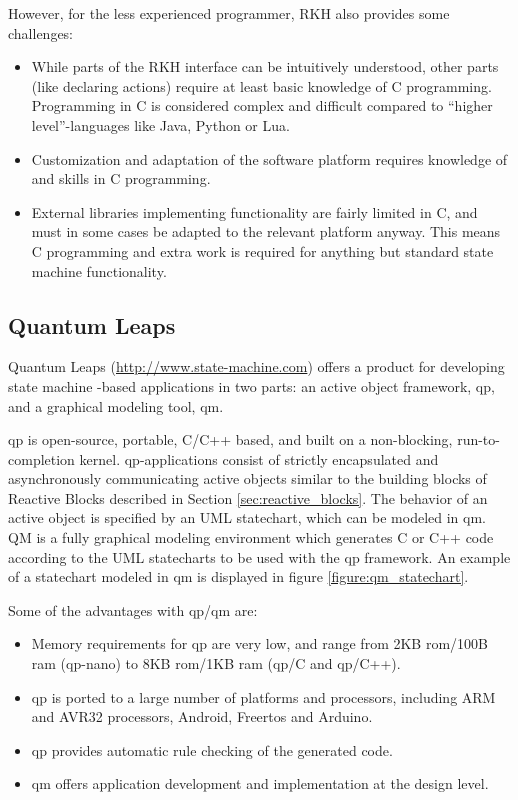 However, for the less experienced programmer, RKH also provides some challenges:
\begin{itemize}
	\item While parts of the RKH interface can be intuitively understood, other parts (like declaring actions) require at least basic knowledge of C programming. Programming in C is considered complex and difficult compared to “higher level”-languages like Java, Python or Lua.
	\item Customization and adaptation of the software platform requires knowledge of and skills in C programming.
	\item External libraries implementing functionality are fairly limited in C, and must in some cases be adapted to the relevant platform anyway. This means C programming and extra work is required for anything but standard state machine functionality.
\end{itemize}

\subsection{Quantum Leaps}
\label{sec:quantum_leaps}
Quantum Leaps (\url{http://www.state-machine.com}) offers a product for developing state machine -based applications in two parts: an active object framework, \gls{qp}, and a graphical modeling tool, \gls{qm}.

\gls{qp} is open-source, portable, C/C++ based, and built on a non-blocking, run-to-completion kernel. \gls{qp}-applications consist of strictly encapsulated and asynchronously communicating active objects similar to the building blocks of Reactive Blocks described in Section \ref{sec:reactive_blocks}. The behavior of an active object is specified by an UML statechart, which can be modeled in \gls{qm}. QM is a fully graphical modeling environment which generates C or C++ code according to the UML statecharts to be used with the \gls{qp} framework. An example of a statechart modeled in \gls{qm} is displayed in figure \ref{figure:qm_statechart}.

Some of the advantages with \gls{qp}/\gls{qm} are:
\begin{itemize}
	\item Memory requirements for \gls{qp} are very low, and range from 2KB \gls{rom}/100B \gls{ram} (\gls{qp}-nano) to 8KB \gls{rom}/1KB \gls{ram} (\gls{qp}/C and \gls{qp}/C++).
	\item \gls{qp} is ported to a large number of platforms and processors, including ARM and AVR32 processors, Android, Free\gls{rtos} and Arduino.
	\item \gls{qp} provides automatic rule checking of the generated code.
	\item \gls{qm} offers application development and implementation at the design level.
\end{itemize}

